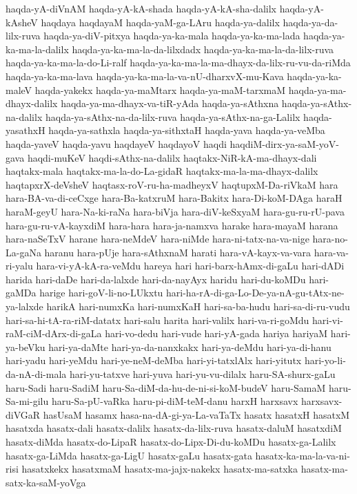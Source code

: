 {haqda-yA-diVnAM
haqda-yA-kA-shada
haqda-yA-kA-sha-dalilx
haqda-yA-kAsheV
haqdaya
haqdayaM
haqda-yaM-ga-LAru
haqda-ya-dalilx
haqda-ya-da-lilx-ruva
haqda-ya-diV-pitxya
haqda-ya-ka-mala
haqda-ya-ka-ma-lada
haqda-ya-ka-ma-la-dalilx
haqda-ya-ka-ma-la-da-lilxdadx
haqda-ya-ka-ma-la-da-lilx-ruva
haqda-ya-ka-ma-la-do-Li-ralf
haqda-ya-ka-ma-la-ma-dhayx-da-lilx-ru-vu-da-riMda
haqda-ya-ka-ma-lava
haqda-ya-ka-ma-la-va-nU-dharxvX-mu-Kava
haqda-ya-ka-maleV
haqda-yakekx
haqda-ya-maMtarx
haqda-ya-maM-tarxmaM
haqda-ya-ma-dhayx-dalilx
haqda-ya-ma-dhayx-va-tiR-yAda
haqda-ya-sAthxna
haqda-ya-sAthx-na-dalilx
haqda-ya-sAthx-na-da-lilx-ruva
haqda-ya-sAthx-na-ga-Lalilx
haqda-yasathxH
haqda-ya-sathxla
haqda-ya-sithxtaH
haqda-yava
haqda-ya-veMba
haqda-yaveV
haqda-yavu
haqdayeV
haqdayoV
haqdi
haqdiM-dirx-ya-saM-yoV-gava
haqdi-muKeV
haqdi-sAthx-na-dalilx
haqtakx-NiR-kA-ma-dhayx-dali
haqtakx-mala
haqtakx-ma-la-do-La-gidaR
haqtakx-ma-la-ma-dhayx-dalilx
haqtapxrX-deVsheV
haqtasx-roV-ru-ha-madheyxV
haqtupxM-Da-riVkaM
hara
hara-BA-va-di-ceCxge
hara-Ba-katxruM
hara-Bakitx
hara-Di-koM-DAga
haraH
haraM-geyU
hara-Na-ki-raNa
hara-biVja
hara-diV-keSxyaM
hara-gu-ru-rU-pava
hara-gu-ru-vA-kayxdiM
hara-hara
hara-ja-namxva
harake
hara-mayaM
harana
hara-naSeTxV
harane
hara-neMdeV
hara-niMde
hara-ni-tatx-na-va-nige
hara-no-La-gaNa
haranu
hara-pUje
hara-sAthxnaM
harati
hara-vA-kayx-va-vara
hara-va-ri-yalu
hara-vi-yA-kA-ra-veMdu
hareya
hari
hari-barx-hAmx-di-gaLu
hari-dADi
harida
hari-daDe
hari-da-lalxde
hari-da-nayAyx
haridu
hari-du-koMDu
hari-gaMDa
harige
hari-goV-li-no-LUkxtu
hari-ha-rA-di-ga-Lo-De-ya-nA-gu-tAtx-ne-ya-lalxde
harikA
hari-numxKa
hari-numxKaH
hari-sa-ba-hudu
hari-sa-di-ru-vudu
hari-sa-hi-tA-ra-riM-datatx
hari-salu
harita
hari-valilx
hari-va-ri-goMdu
hari-vi-raM-ciM-dArx-di-gaLa
hari-vo-dedu
hari-vude
hari-yA-gada
hariya
hariyaM
hari-ya-beVku
hari-ya-daMte
hari-ya-da-nanxkakx
hari-ya-deMdu
hari-ya-di-hanu
hari-yadu
hari-yeMdu
hari-ye-neM-deMba
hari-yi-tatxlAlx
hari-yitutx
hari-yo-li-da-nA-di-mala
hari-yu-tatxve
hari-yuva
hari-yu-vu-dilalx
haru-SA-shurx-gaLu
haru-Sadi
haru-SadiM
haru-Sa-diM-da-hu-de-ni-si-koM-budeV
haru-SamaM
haru-Sa-mi-gilu
haru-Sa-pU-vaRka
haru-pi-diM-teM-danu
harxH
harxsavx
harxsavx-diVGaR
hasUsaM
hasamx
hasa-na-dA-gi-ya-La-vaTaTx
hasatx
hasatxH
hasatxM
hasatxda
hasatx-dali
hasatx-dalilx
hasatx-da-lilx-ruva
hasatx-daluM
hasatxdiM
hasatx-diMda
hasatx-do-LipaR
hasatx-do-Lipx-Di-du-koMDu
hasatx-ga-Lalilx
hasatx-ga-LiMda
hasatx-ga-LigU
hasatx-gaLu
hasatx-gata
hasatx-ka-ma-la-va-ni-risi
hasatxkekx
hasatxmaM
hasatx-ma-jajx-nakekx
hasatx-ma-satxka
hasatx-ma-satx-ka-saM-yoVga
}
